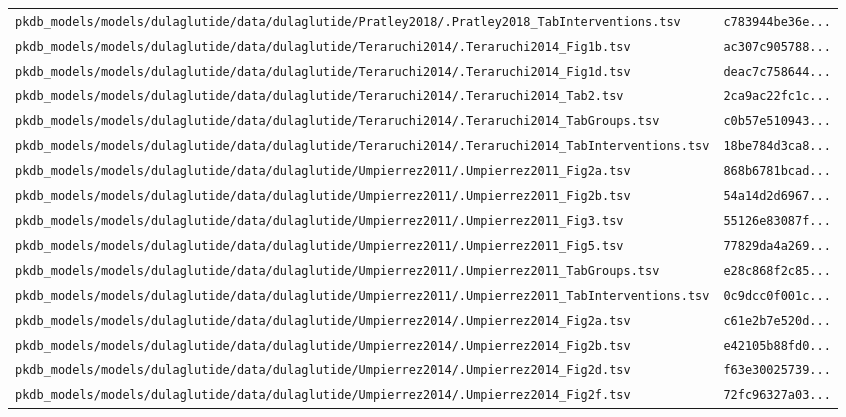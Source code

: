 \documentclass{article}
\begin{document}
\begin{longtable}{ll}
\texttt{pkdb\_models/models/dulaglutide/data/dulaglutide/Pratley2018/.Pratley2018\_TabInterventions.tsv} & \texttt{c783944be36e...} \\
\texttt{pkdb\_models/models/dulaglutide/data/dulaglutide/Teraruchi2014/.Teraruchi2014\_Fig1b.tsv} & \texttt{ac307c905788...} \\
\texttt{pkdb\_models/models/dulaglutide/data/dulaglutide/Teraruchi2014/.Teraruchi2014\_Fig1d.tsv} & \texttt{deac7c758644...} \\
\texttt{pkdb\_models/models/dulaglutide/data/dulaglutide/Teraruchi2014/.Teraruchi2014\_Tab2.tsv} & \texttt{2ca9ac22fc1c...} \\
\texttt{pkdb\_models/models/dulaglutide/data/dulaglutide/Teraruchi2014/.Teraruchi2014\_TabGroups.tsv} & \texttt{c0b57e510943...} \\
\texttt{pkdb\_models/models/dulaglutide/data/dulaglutide/Teraruchi2014/.Teraruchi2014\_TabInterventions.tsv} & \texttt{18be784d3ca8...} \\
\texttt{pkdb\_models/models/dulaglutide/data/dulaglutide/Umpierrez2011/.Umpierrez2011\_Fig2a.tsv} & \texttt{868b6781bcad...} \\
\texttt{pkdb\_models/models/dulaglutide/data/dulaglutide/Umpierrez2011/.Umpierrez2011\_Fig2b.tsv} & \texttt{54a14d2d6967...} \\
\texttt{pkdb\_models/models/dulaglutide/data/dulaglutide/Umpierrez2011/.Umpierrez2011\_Fig3.tsv} & \texttt{55126e83087f...} \\
\texttt{pkdb\_models/models/dulaglutide/data/dulaglutide/Umpierrez2011/.Umpierrez2011\_Fig5.tsv} & \texttt{77829da4a269...} \\
\texttt{pkdb\_models/models/dulaglutide/data/dulaglutide/Umpierrez2011/.Umpierrez2011\_TabGroups.tsv} & \texttt{e28c868f2c85...} \\
\texttt{pkdb\_models/models/dulaglutide/data/dulaglutide/Umpierrez2011/.Umpierrez2011\_TabInterventions.tsv} & \texttt{0c9dcc0f001c...} \\
\texttt{pkdb\_models/models/dulaglutide/data/dulaglutide/Umpierrez2014/.Umpierrez2014\_Fig2a.tsv} & \texttt{c61e2b7e520d...} \\
\texttt{pkdb\_models/models/dulaglutide/data/dulaglutide/Umpierrez2014/.Umpierrez2014\_Fig2b.tsv} & \texttt{e42105b88fd0...} \\
\texttt{pkdb\_models/models/dulaglutide/data/dulaglutide/Umpierrez2014/.Umpierrez2014\_Fig2d.tsv} & \texttt{f63e30025739...} \\
\texttt{pkdb\_models/models/dulaglutide/data/dulaglutide/Umpierrez2014/.Umpierrez2014\_Fig2f.tsv} & \texttt{72fc96327a03...} \\

\end{longtable}
\end{document}
